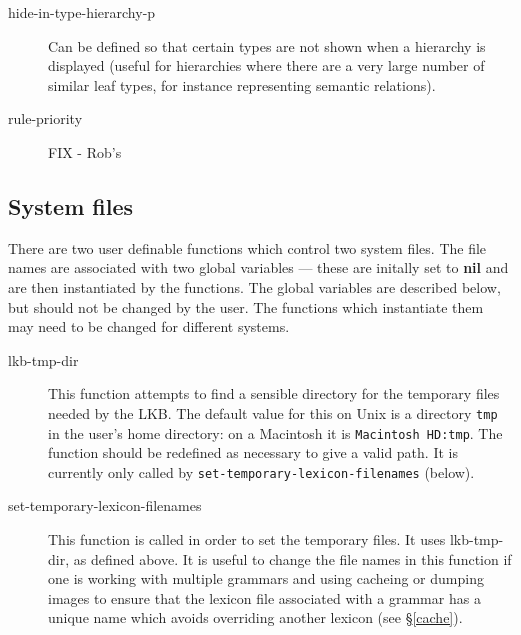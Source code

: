 \documentclass[12pt]{report}
\begin{document}
\begin{description}
\item[hide-in-type-hierarchy-p] Can be defined so that certain types
are not shown when a hierarchy is displayed (useful for hierarchies
where there are a very large number of similar leaf types, for instance
representing semantic relations).

\item[rule-priority] 

FIX - Rob's

\end{description}

\subsection{System files}
\label{sysglob}

There are two user definable functions which control two system files.
The file names are associated with two global variables --- these are
initally set to {\bf nil} and are then instantiated by the functions.  The
global variables are described below, but should not be changed
by the user.  The functions which instantiate them may need to be changed
for different systems.

\begin{description}
\item[lkb-tmp-dir] This function attempts to find a sensible directory for
the temporary files needed by the LKB.  The default value for this
on Unix is a directory {\tt tmp} in the user's home directory: on a Macintosh
it is {\tt Macintosh HD:tmp}.  The function should be redefined as necessary
to give a valid path.  It is currently only called by 
{\tt set-temporary-lexicon-filenames} (below).

\item[set-temporary-lexicon-filenames] This function is called in order to
set the temporary files.  It uses lkb-tmp-dir, as defined above.
It is useful to change the file names in this function if one is
working with multiple grammars and using cacheing or dumping images to
ensure that the lexicon file associated with a grammar has a 
unique name which avoids overriding another lexicon
(see \S\ref{cache}).
\end{description}
\end{document}
